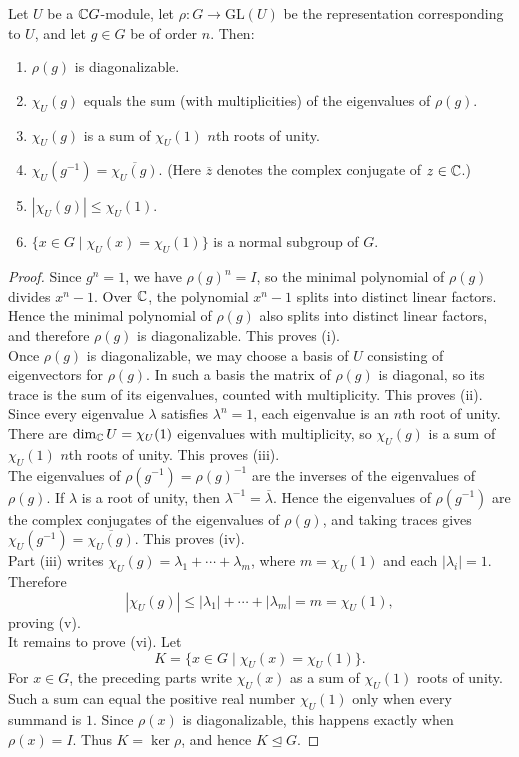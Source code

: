\documentclass[../Odyssey_Project.tex]{subfiles}
\begin{document}
\begin{proposition}
\label{prop:14.4}
Let $U$ be a $\mathbb{C} G$-module, let $\rho \colon G \to \mathrm{GL}(U)$ be the representation corresponding to $U$, and let $g \in G$ be of order $n$. Then:
\begin{enumerate}
    \item[(i)] $\rho(g)$ is diagonalizable.
    \item[(ii)] $\chi_U(g)$ equals the sum (with multiplicities) of the eigenvalues of $\rho(g)$.
    \item[(iii)] $\chi_U(g)$ is a sum of $\chi_U(1)$ $n$th roots of unity.
    \item[(iv)] $\chi_U(g^{-1}) = \overline{\chi_U(g)}$. (Here $\overline{z}$ denotes the complex conjugate of $z \in \mathbb{C}$.)
    \item[(v)] $|\chi_U(g)| \leq \chi_U(1)$.
    \item[(vi)] $\{x \in G \mid \chi_U(x) = \chi_U(1)\}$ is a normal subgroup of $G$.
\end{enumerate}
\end{proposition}
\begin{proof}
    Since $g^n=1$, we have $\rho(g)^n=I$, so the minimal polynomial of $\rho(g)$ divides $x^n-1$. Over $\mathbb{C}$, the polynomial $x^n-1$ splits into distinct linear factors. Hence the minimal polynomial of $\rho(g)$ also splits into distinct linear factors, and therefore $\rho(g)$ is diagonalizable. This proves (i).\\
    Once $\rho(g)$ is diagonalizable, we may choose a basis of $U$ consisting of eigenvectors for $\rho(g)$. In such a basis the matrix of $\rho(g)$ is diagonal, so its trace is the sum of its eigenvalues, counted with multiplicity. This proves (ii). Since every eigenvalue $\lambda$ satisfies $\lambda^n=1$, each eigenvalue is an $n$th root of unity. There are $\dim_{\mathbb{C}}U=\chi_U(1)$ eigenvalues with multiplicity, so $\chi_U(g)$ is a sum of $\chi_U(1)$ $n$th roots of unity. This proves (iii).\\
    The eigenvalues of $\rho(g^{-1})=\rho(g)^{-1}$ are the inverses of the eigenvalues of $\rho(g)$. If $\lambda$ is a root of unity, then $\lambda^{-1}=\overline{\lambda}$. Hence the eigenvalues of $\rho(g^{-1})$ are the complex conjugates of the eigenvalues of $\rho(g)$, and taking traces gives $\chi_U(g^{-1})=\overline{\chi_U(g)}$. This proves (iv).\\
    Part (iii) writes $\chi_U(g)=\lambda_1+\cdots+\lambda_m$, where $m=\chi_U(1)$ and each $|\lambda_i|=1$. Therefore
    \[
        |\chi_U(g)| \leq |\lambda_1|+\cdots+|\lambda_m|=m=\chi_U(1),
    \]
    proving (v).\\
    It remains to prove (vi). Let
    \[
        K=\{x \in G \mid \chi_U(x)=\chi_U(1)\}.
    \]
    For $x \in G$, the preceding parts write $\chi_U(x)$ as a sum of $\chi_U(1)$ roots of unity. Such a sum can equal the positive real number $\chi_U(1)$ only when every summand is $1$. Since $\rho(x)$ is diagonalizable, this happens exactly when $\rho(x)=I$. Thus $K=\ker\rho$, and hence $K \trianglelefteq G$.
\end{proof}
\end{document}
